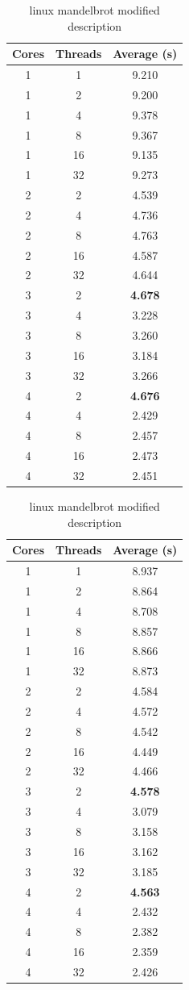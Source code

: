 \documentclass[bsc,frontabs,twoside,singlespacing,parskip,deptreport]{infthesis}     %
\begin{document}
\begin{table}[h]
\parbox{.45\linewidth}{
\centering
\label{timing-infos-mb-mod}
\scriptsize
\begin{tabular}{ccc}
\toprule
Cores &Threads &Average (s) \\
\midrule
1 &1 &9.210 \\
\midrule
1 &2 &9.200 \\
1 &4 &9.378 \\
1 &8 &9.367 \\
1 &16 &9.135 \\
1 &32 &9.273 \\
\midrule
2 &2 &4.539 \\
2 &4 &4.736 \\
2 &8 &4.763 \\
2 &16 &4.587 \\
2 &32 &4.644 \\
\midrule
3 &2 &\textbf{4.678} \\
3 &4 &3.228 \\
3 &8 &3.260 \\
3 &16 &3.184 \\
3 &32 &3.266 \\
\midrule
4 &2 &\textbf{4.676} \\
4 &4 &2.429 \\
4 &8 &2.457 \\
4 &16 &2.473 \\
4 &32 &2.451 \\
\bottomrule
\end{tabular}
\caption{Infos mandelbrot modified description}
}
\hfill
\parbox{.45\linewidth}{
\centering
\label{timing-linux-mb-mod}
\scriptsize
\begin{tabular}{ccc}
\toprule
Cores &Threads &Average (s) \\
\midrule
1 &1 &8.937 \\
\midrule
1 &2 &8.864 \\
1 &4 &8.708 \\
1 &8 &8.857 \\
1 &16 &8.866 \\
1 &32 &8.873 \\
\midrule
2 &2 &4.584 \\
2 &4 &4.572 \\
2 &8 &4.542 \\
2 &16 &4.449 \\
2 &32 &4.466 \\
\midrule
3 &2 &\textbf{4.578} \\
3 &4 &3.079 \\
3 &8 &3.158 \\
3 &16 &3.162 \\
3 &32 &3.185 \\
\midrule
4 &2 &\textbf{4.563} \\
4 &4 &2.432 \\
4 &8 &2.382 \\
4 &16 &2.359 \\
4 &32 &2.426 \\
\bottomrule
\end{tabular}
\caption{linux mandelbrot modified description}
}
\end{table}




\end{document}
